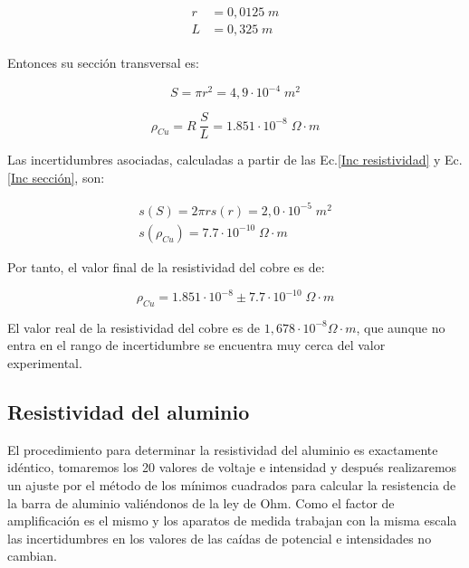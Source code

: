 \documentclass[a4paper,12pt,titlepage]{report}
\begin{document}
\begin{align}
    \begin{split}
        r &= 0,0125\; m\\
        L &= 0,325\; m
    \end{split}
\end{align}

Entonces su sección transversal es:

\begin{equation}
    S = \pi r^2 = 4,9 \cdot 10^{-4}\; m^2
\end{equation}

\begin{equation}
    \rho_{Cu} = R \: \frac{S}{L} = 1.851 \cdot 10^{-8} \; \Omega \cdot m
\end{equation}

Las incertidumbres asociadas, calculadas a partir de las Ec.\ref{Inc resistividad} y Ec.\ref{Inc sección}, son:

\begin{equation}
    \begin{gathered}
        s(S) = 2\pi r s(r) = 2,0 \cdot 10^{-5} \; m^2
        \\
        s(\rho_{Cu}) = 7.7 \cdot 10^{-10} \; \Omega \cdot m
    \end{gathered}
\end{equation}

Por tanto, el valor final de la resistividad del cobre es de:

\begin{equation}
    \rho_{Cu} = 1.851 \cdot 10^{-8} \pm 7.7 \cdot 10^{-10} \; \Omega \cdot m
\end{equation}

El valor real de la resistividad del cobre es de $1,678 \cdot 10^{-8} \Omega \cdot m$, que aunque no entra en el rango de incertidumbre se encuentra muy cerca del valor experimental.

\subsection{Resistividad del aluminio}

El procedimiento para determinar la resistividad del aluminio es exactamente idéntico, tomaremos los 20 valores de voltaje e intensidad y después realizaremos un ajuste por el método de los mínimos cuadrados para calcular la resistencia de la barra de aluminio valiéndonos de la ley de Ohm. Como el factor de amplificación es el mismo y los aparatos de medida trabajan con la misma escala las incertidumbres en los valores de las caídas de potencial e intensidades no cambian.
\end{document}
